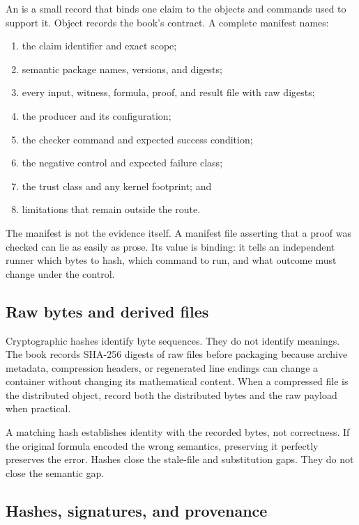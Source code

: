 An  is a small record that binds one claim to the
objects and commands used to support it. Object 
records the book's contract. A complete manifest names:
\label{def:evidence-manifest}

\begin{enumerate}
\item the claim identifier and exact scope;
\item semantic package names, versions, and digests;
\item every input, witness, formula, proof, and result file with raw digests;
\item the producer and its configuration;
\item the checker command and expected success condition;
\item the negative control and expected failure class;
\item the trust class and any kernel footprint; and
\item limitations that remain outside the route.
\end{enumerate}

The manifest is not the evidence itself. A manifest file asserting that a proof
was checked can lie as easily as prose. Its value is binding: it tells an
independent runner which bytes to hash, which command to run, and what outcome
must change under the control.

\subsection{Raw bytes and derived files}

Cryptographic hashes identify byte sequences. They do not identify meanings.
The book records SHA-256 digests of raw files before packaging because archive
metadata, compression headers, or regenerated line endings can change a
container without changing its mathematical content. When a compressed file
is the distributed object, record both the distributed bytes and the raw
payload when practical.

A matching hash establishes identity with the recorded bytes, not correctness.
If the original formula encoded the wrong semantics, preserving it perfectly
preserves the error. Hashes close the stale-file and substitution gaps. They
do not close the semantic gap.

\subsection{Hashes, signatures, and provenance}

